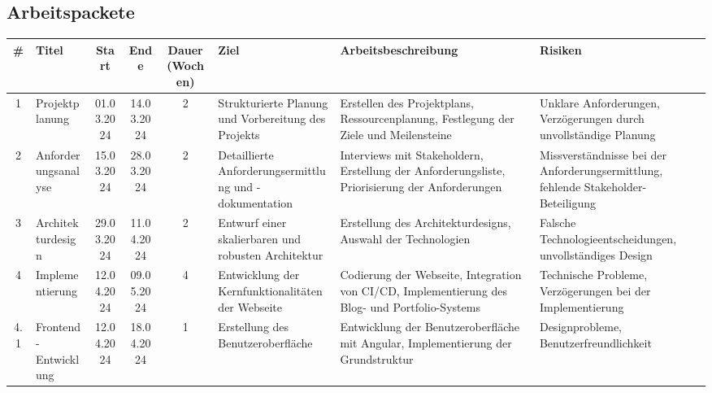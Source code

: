 \begin{landscape}
    \subsection{ Arbeitspackete}

    \begin{longtable}{|c|l|c|c|c|p{3cm}|p{3cm}|p{3cm}|}
        \hline
        \# & Titel                       & Start       & Ende        & Dauer (Wochen) & Ziel                                                                 & Arbeitsbeschreibung                                                      & Risiken                                                       \\ \hline
        1  & Projektplanung              & 01.03.2024  & 14.03.2024  & 2              & Strukturierte Planung und Vorbereitung des Projekts                  & Erstellen des Projektplans, Ressourcenplanung, Festlegung der Ziele und Meilensteine & Unklare Anforderungen, Verzögerungen durch unvollständige Planung   \\ \hline
        2  & Anforderungsanalyse         & 15.03.2024  & 28.03.2024  & 2              & Detaillierte Anforderungsermittlung und -dokumentation                & Interviews mit Stakeholdern, Erstellung der Anforderungsliste, Priorisierung der Anforderungen & Missverständnisse bei der Anforderungsermittlung, fehlende Stakeholder-Beteiligung \\ \hline
        3  & Architekturdesign           & 29.03.2024  & 11.04.2024  & 2              & Entwurf einer skalierbaren und robusten Architektur                   & Erstellung des Architekturdesigns, Auswahl der Technologien                        & Falsche Technologieentscheidungen, unvollständiges Design            \\ \hline
        4  & Implementierung             & 12.04.2024  & 09.05.2024  & 4              & Entwicklung der Kernfunktionalitäten der Webseite                     & Codierung der Webseite, Integration von CI/CD, Implementierung des Blog- und Portfolio-Systems & Technische Probleme, Verzögerungen bei der Implementierung           \\ \hline
        4.1 & Frontend-Entwicklung        & 12.04.2024  & 18.04.2024  & 1              & Erstellung des Benutzeroberfläche                                      & Entwicklung der Benutzeroberfläche mit Angular, Implementierung der Grundstruktur & Designprobleme, Benutzerfreundlichkeit                              \\ \hline

\end{longtable}
\end{landscape}
